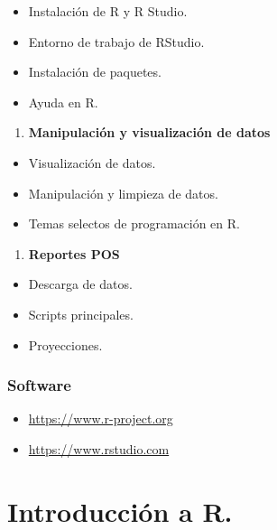 \documentclass[
]{book}
\providecommand{\tightlist}{%
  \setlength{\itemsep}{0pt}\setlength{\parskip}{0pt}}
\begin{document}
\begin{itemize}
\tightlist
\item
  Instalación de R y R Studio.
\item
  Entorno de trabajo de RStudio.
\item
  Instalación de paquetes.
\item
  Ayuda en R.
\end{itemize}

\begin{enumerate}
\def\labelenumi{\arabic{enumi}.}
\setcounter{enumi}{1}
\tightlist
\item
  \textbf{Manipulación y visualización de datos}
\end{enumerate}

\begin{itemize}
\tightlist
\item
  Visualización de datos.
\item
  Manipulación y limpieza de datos.
\item
  Temas selectos de programación en R.
\end{itemize}

\begin{enumerate}
\def\labelenumi{\arabic{enumi}.}
\setcounter{enumi}{2}
\tightlist
\item
  \textbf{Reportes POS}
\end{enumerate}

\begin{itemize}
\tightlist
\item
  Descarga de datos.
\item
  Scripts principales.
\item
  Proyecciones.
\end{itemize}

\hypertarget{software}{%
\subsection*{Software}\label{software}}

\begin{itemize}
\tightlist
\item
  \url{https://www.r-project.org}
\item
  \url{https://www.rstudio.com}
\end{itemize}

\hypertarget{introducciuxf3n-a-r.}{%
\chapter{Introducción a R.}\label{introducciuxf3n-a-r.}}
\end{document}
